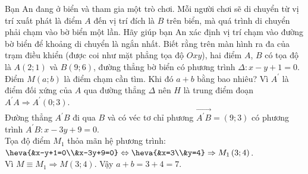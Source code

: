 \begin{bt}%
	Bạn An đang ở biển và tham gia một trò chơi. Mỗi người chơi sẽ di chuyển từ vị trí xuất phát là điểm $A$ đến vị trí đích là  $B$ trên biển, mà quá trình di chuyển phải chạm vào bờ biển một lần. Hãy giúp bạn An xác định vị trí chạm vào đường bờ biển để khoảng di chuyển là ngắn nhất. Biết rằng trên màn hình ra đa của trạm điều khiển (được coi như mặt phẳng tọa độ  $Oxy$), hai điểm $A$, $B$ có tọa độ là $A\left(2; 1\right)$ và $B\left(9; 6\right)$, đường thẳng bờ biển có phương trình $\Delta:x-y+1=0$. Điểm $M\left(a; b\right)$ là điểm chạm cần tìm. Khi đó $a+b$ bằng bao nhiêu?
	\loigiai
	{
		Vì $A^\prime$  là điểm đối xứng của $A$ qua đường thẳng $\Delta$ nên $H$ là trung điểm đoạn $A^\prime A\Rightarrow A^\prime\left(0; 3\right)$.\\
		Đường thẳng $A^\prime B$ đi qua $B$ và có véc tơ chỉ phương $\overrightarrow{A^\prime B}=\left(9; 3\right)$ có phương trình $A^\prime B: x-3y+9=0$.\\
		Tọa độ điểm $M_1$ thỏa mãn hệ phương trình: $\heva{&x-y+1=0\\&x-3y+9=0}\Leftrightarrow \heva{&x=3\\&y=4}\Rightarrow M_1\left(3; 4\right)$.\\
		Vì $M\equiv M_1 \Rightarrow M\left(3; 4\right)$.
		Vậy $a+b=3+4=7$.
	}
\end{bt}

